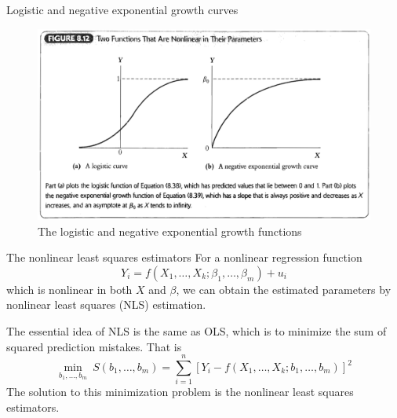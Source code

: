 \documentclass[presentation,10pt]{beamer}
\begin{document}
\begin{frame}[label={sec:org54e1d37}]{Logistic and negative exponential growth curves}
\begin{figure}[htbp]
\centering
\includegraphics[width=.9\linewidth]{img/fig-8-12.png}
\caption{\label{fig:org0ec3b21}
The logistic and negative exponential growth functions}
\end{figure}
\end{frame}

\begin{frame}[label={sec:org4bbc184}]{The nonlinear least squares estimators}
For a nonlinear regression function
\[ Y_i = f(X_1, \ldots, X_k; \beta_1, \ldots, \beta_m) + u_i \]
which is nonlinear in both \(X\) and \(\beta\), we can obtain the
estimated parameters by \alert{nonlinear least squares} (NLS) estimation. 

\vspace{0.1cm}

The essential idea of NLS is the same as OLS, which is to minimize the sum
of squared prediction mistakes. That is
\begin{equation*}
\operatorname*{min}_{b_1, \ldots, b_m}\: S(b_1, \ldots, b_m) = \sum_{i=1}^n \left[ Y_i - f(X_1, \ldots, X_k; b_1, \ldots, b_m) \right]^2
\end{equation*}
The solution to this minimization problem is the nonlinear least
squares estimators.
\end{frame}
\end{document}
